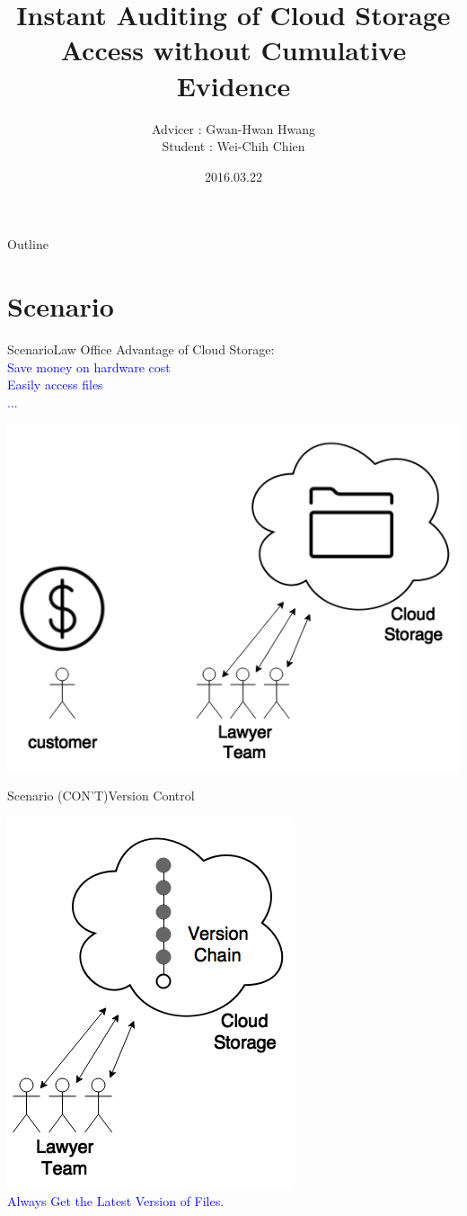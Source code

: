 \documentclass{beamer}
\title[Progress Report]{Instant Auditing of Cloud Storage Access without Cumulative Evidence}
\author[Wei-Chih Chien]{Advicer : Gwan-Hwan Hwang\\ Student : Wei-Chih Chien}
\institute[NTNU CSIE CCLAB]{NTNU CSIE CCLAB}
\date{2016.03.22}
\begin{document}
\begin{CJK}{UTF8}{bkai}

\begin{frame}
  \titlepage
\end{frame}

\begin{frame}{Outline}
  \tableofcontents
\end{frame}

\section{Scenario}
\begin{frame}{Scenario}{Law Office}
	\alert{Advantage of Cloud Storage:}\\
	\textcolor{blue}{
		\hspace{.1\textwidth}Save money on hardware cost\\
		\hspace{.1\textwidth}Easily access files\\
		\hspace{.1\textwidth}...
	}
	\begin{center}
		\includegraphics[width=.5\textwidth]{Scenario1}
	\end{center}
\end{frame}

\begin{frame}{Scenario (CON'T)}{Version Control}
	\begin{center}
		\includegraphics[width=.4\textwidth]{Scenario2}\\
		\textcolor{blue}{Always Get the Latest Version of Files.}
	\end{center}
\end{frame}


\end{CJK}
\end{document}
